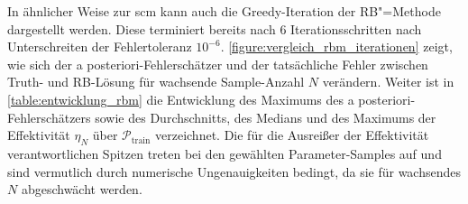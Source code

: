\documentclass[../main.tex]{subfiles}
\begin{document}
In ähnlicher Weise zur \ac{scm} kann auch die Greedy-Iteration der RB"=Methode dargestellt werden.
Diese terminiert bereits nach $6$ Iterationsschritten nach Unterschreiten der Fehlertoleranz $10^{-6}$.
\cref{figure:vergleich_rbm_iterationen} zeigt, wie sich der a posteriori-Fehlerschätzer und der tatsächliche Fehler zwischen Truth- und RB-Lösung für wachsende Sample-Anzahl $N$ verändern.
Weiter ist in \cref{table:entwicklung_rbm} die Entwicklung des Maximums des a posteriori-Fehlerschätzers sowie des Durchschnitts, des Medians und des Maximums der Effektivität $\eta_{N}$ über $\mathcal P_{\mathrm{train}}$ verzeichnet.
Die für die Ausreißer der Effektivität verantwortlichen Spitzen treten bei den gewählten Parameter-Samples auf und sind vermutlich durch numerische Ungenauigkeiten bedingt, da sie für wachsendes $N$ abgeschwächt werden.
\end{document}
